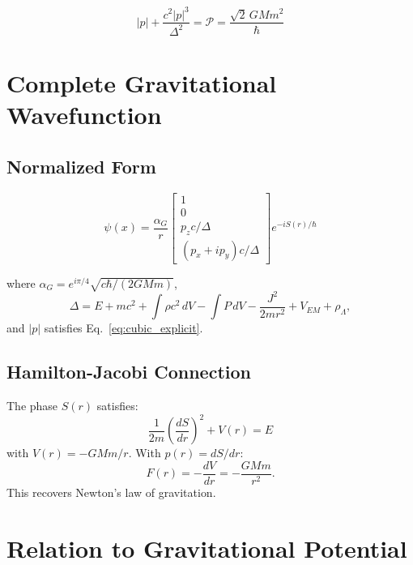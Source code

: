 \documentclass[11pt,a4paper]{article}
\theoremstyle{definition}
\theoremstyle{remark}
\begin{document}
	\begin{equation}
		\boxed{|p| + \frac{c^2|p|^3}{\Delta^2} = \mathcal{P} = \frac{\sqrt{2}\,GMm^2}{\hbar}}
		\label{eq:cubic_explicit}
	\end{equation}
	
	\section{Complete Gravitational Wavefunction}
	
	\subsection{Normalized Form}
	
	\begin{equation}
		\boxed{\psi(x) = \frac{\alpha_G}{r}\begin{bmatrix}1\\0\\ p_zc/\Delta\\ (p_x+ip_y)c/\Delta\end{bmatrix}e^{-iS(r)/\hbar}}
		\label{eq:normalized_wavefunction}
	\end{equation}
	
	where $\alpha_G = e^{i\pi/4}\sqrt{c\hbar/(2GMm)}$,
	\begin{equation}
		\Delta = E + mc^2 + \int\rho c^2\,dV - \int P\,dV - \frac{J^2}{2mr^2} + V_{EM} + \rho_\Lambda,
	\end{equation}
	and $|p|$ satisfies Eq.~\eqref{eq:cubic_explicit}.
	
	\subsection{Hamilton-Jacobi Connection}
	
	The phase $S(r)$ satisfies:
	\begin{equation}
		\frac{1}{2m}\!\left(\frac{dS}{dr}\right)^2 + V(r) = E
	\end{equation}
	with $V(r)=-GMm/r$.  With $p(r)=dS/dr$:
	\begin{equation}
		F(r) = -\frac{dV}{dr} = -\frac{GMm}{r^2}.
	\end{equation}
	This recovers Newton's law of gravitation.
	
	\section{Relation to Gravitational Potential}
	
\end{document}
